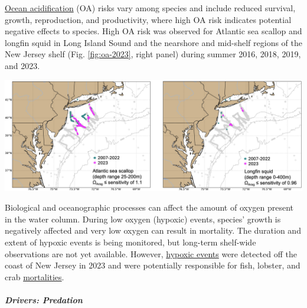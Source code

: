 \documentclass[
  10pt,
]{article}
\let\origfigure\figure
\let\endorigfigure\endfigure
\renewenvironment{figure}[1][2] {
    \expandafter\origfigure\expandafter[H]
} {
    \endorigfigure
}
\begin{document}
\href{https://noaa-edab.github.io/catalog/ocean_acidification.html}{Ocean acidification} (OA) risks vary among species and include reduced survival, growth, reproduction, and productivity, where high OA risk indicates potential negative effects to species. High OA risk was observed for Atlantic sea scallop and longfin squid in Long Island Sound and the nearshore and mid-shelf regions of the New Jersey shelf (Fig. \ref{fig:oa-2023}, right panel) during summer 2016, 2018, 2019, and 2023.

\begin{figure}

{\centering \includegraphics{SOE-NEFMC_files/figure-latex/oa-2023-1} 

}

\caption{Locations where bottom aragonite saturation state ($\Omega_{Arag}$; summer only: June-August) were at or below the laboratory-derived sensitivity level for Atlantic sea scallop (left panel) and longfin squid (right panel) for the time periods 2007-2022 (dark cyan) and 2023 only (magenta). Gray circles indicate locations where bottom $\Omega_{Arag}$ values were above the species specific sensitivity values.}\label{fig:oa-2023}
\end{figure}

Biological and oceanographic processes can affect the amount of oxygen present in the water column. During low oxygen (hypoxic) events, species' growth is negatively affected and very low oxygen can result in mortality. The duration and extent of hypoxic events is being monitored, but long-term shelf-wide observations are not yet available. However, \href{https://noaa-edab.github.io/catalog/observation_synthesis.html}{hypoxic events} were detected off the coast of New Jersey in 2023 and were potentially responsible for fish, lobster, and crab \href{https://sebsnjaesnews.rutgers.edu/2023/12/rutgers-scientists-observe-unusual-ocean-conditions-possibly-linked-to-mortality-in-marine-life-off-new-jersey/}{mortalities}.

\hypertarget{drivers-predation}{%
\subparagraph{Drivers: Predation}\label{drivers-predation}}
\end{document}
